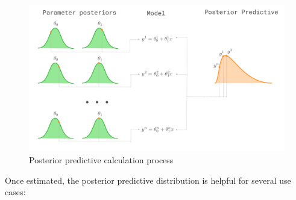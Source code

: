\begin{figure}[H]
    \centering
    \includegraphics[width=1.0\textwidth]{images/ch3_posterior_pred/posterior_pred.png}
    \caption{Posterior predictive calculation process}
    \label{fig:posterior_pred}
\end{figure}

Once estimated, the posterior predictive distribution is helpful for several use cases: 

